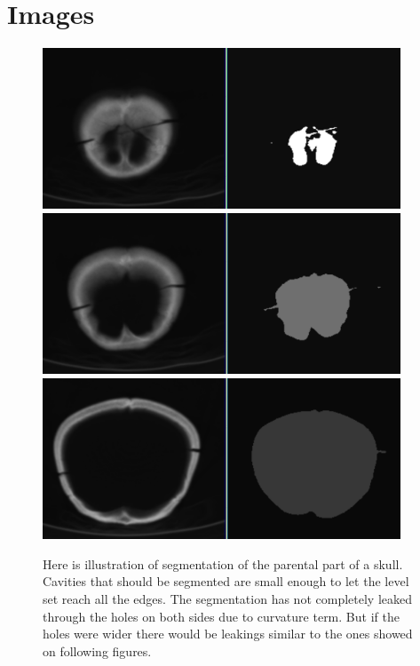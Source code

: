 \chapter{Images}

\begin{figure}
    \centering
    \includegraphics[width=0.95\textwidth]{data/png/2}
    \includegraphics[width=0.95\textwidth]{data/png/4}
    \includegraphics[width=0.95\textwidth]{data/png/7}
    \caption[Result of segmentation of parietal part of a skull]
{
Here is illustration of segmentation of the parental part of a skull.
Cavities that should be segmented are small enough to let the level set reach all the edges.
The segmentation has not completely leaked through the holes on both sides due to curvature term.
But if the holes were wider there would be leakings similar to the ones showed on following figures.
}
    \label{fg:parietalSlicesSegmentation}
\end{figure}

